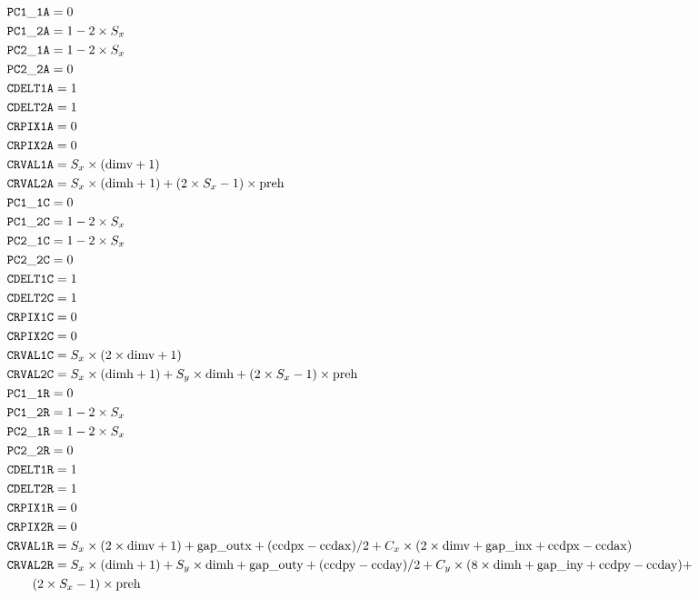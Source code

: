 \documentclass{article}[12pt]
\begin{document}
\begin{align*}
& {\tt PC1\_1A} = 0 \\
& {\tt PC1\_2A} = 1 - 2 \times S_x \\
& {\tt PC2\_1A} = 1 - 2 \times S_x \\
& {\tt PC2\_2A} = 0 \\
& {\tt CDELT1A} = 1 \\
& {\tt CDELT2A} = 1 \\
& {\tt CRPIX1A} = 0 \\
& {\tt CRPIX2A} = 0 \\
& {\tt CRVAL1A }= S_x \times ({\rm dimv} + 1) \\
& {\tt CRVAL2A} = S_x \times ({\rm dimh} + 1) + (2 \times S_x - 1) \times {\rm preh} \\
& {\tt PC1\_1C} = 0  \\
& {\tt PC1\_2C} = 1 - 2 \times S_x \\
& {\tt PC2\_1C} = 1 - 2 \times S_x \\
& {\tt PC2\_2C} = 0 \\
& {\tt CDELT1C} = 1 \\
& {\tt CDELT2C} = 1 \\
& {\tt CRPIX1C} = 0 \\
& {\tt CRPIX2C} = 0 \\
& {\tt CRVAL1C} = S_x \times (2 \times {\rm dimv} + 1) \\
& {\tt CRVAL2C} = S_x \times ({\rm dimh} + 1) + S_y \times {\rm dimh}  + (2 \times S_x - 1) \times {\rm preh}  \\
& {\tt PC1\_1R} = 0  \\
& {\tt PC1\_2R} = 1 - 2 \times S_x \\
& {\tt PC2\_1R} = 1 - 2 \times S_x \\
& {\tt PC2\_2R} = 0 \\
& {\tt CDELT1R} = 1 \\
& {\tt CDELT2R} = 1 \\
& {\tt CRPIX1R} = 0 \\
& {\tt CRPIX2R} = 0 \\
& {\tt CRVAL1R} = S_x \times (2 \times {\rm dimv} + 1) + {\rm gap\_outx} + ({\rm ccdpx} - {\rm ccdax})/2 + C_x \times (2 \times {\rm dimv} + {\rm gap\_inx} + {\rm ccdpx} - {\rm ccdax}) \\
& {\tt CRVAL2R} = S_x \times ({\rm dimh} + 1) + S_y \times {\rm dimh} +  {\rm gap\_outy} + ({\rm ccdpy} - {\rm ccday})/2 + C_y \times ( 8 \times {\rm dimh} + {\rm gap\_iny} + {\rm ccdpy} - {\rm ccday}) +  \\  &\qquad {} (2 \times S_x - 1) \times {\rm preh} \\

\end{align*}
\end{document}
